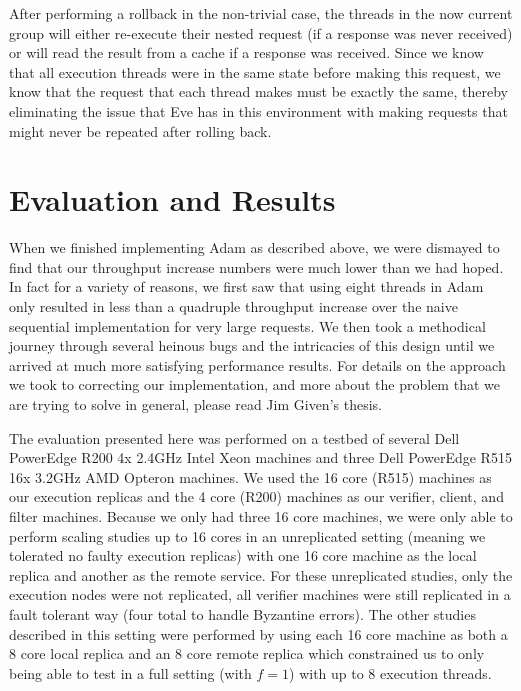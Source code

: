 \documentclass[11pt, oneside]{report}
\begin{document}
After performing a rollback in the non-trivial case, the threads in the now current group will either re-execute their nested request (if a response was never received) or will read the result from a cache if a response was received.
Since we know that all execution threads were in the same state before making this request, we know that the request that each thread makes must be exactly the same, thereby eliminating the issue that Eve has in this environment with making requests that might never be repeated after rolling back.

\chapter{Evaluation and Results}\label{AdamResults}

When we finished implementing Adam as described above, we were dismayed to find that our throughput increase numbers were much lower than we had hoped. 
In fact for a variety of reasons, we first saw that using eight threads in Adam only resulted in less than a quadruple throughput increase over the naive sequential implementation for very large requests. 
We then took a methodical journey through several heinous bugs and the intricacies of this design until we arrived at much more satisfying performance results. 
For details on the approach we took to correcting our implementation, and more about the problem that we are trying to solve in general, please read Jim Given's thesis.

The evaluation presented here was performed on a testbed of several Dell PowerEdge R200 4x 2.4GHz Intel Xeon machines and three Dell PowerEdge R515 16x 3.2GHz AMD Opteron machines. 
We used the 16 core (R515) machines as our execution replicas and the 4 core (R200) machines as our verifier, client, and filter machines. 
Because we only had three 16 core machines, we were only able to perform scaling studies up to 16 cores in an unreplicated setting (meaning we tolerated no faulty execution replicas) with one 16 core machine as the local replica and another as the remote service. 
For these unreplicated studies, only the execution nodes were not replicated, all verifier machines were still replicated in a fault tolerant way (four total to handle Byzantine errors).
The other studies described in this setting were performed by using each 16 core machine as both a 8 core local replica and an 8 core remote replica which constrained us to only being able to test in a full setting (with $f = 1$) with up to 8 execution threads.
\end{document}
